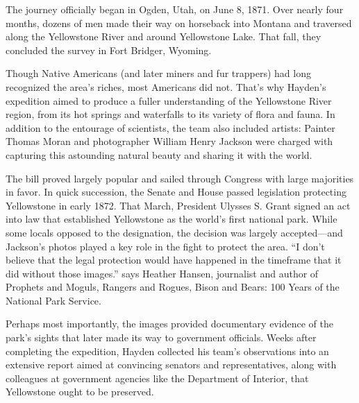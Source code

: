 \begin{listmatch}
\item 
The journey officially began in Ogden, Utah, on June 8, 1871. Over nearly four months, dozens of men made their way on horseback into Montana and traversed along the Yellowstone River and around Yellowstone Lake. That fall, they concluded the survey in Fort Bridger, Wyoming.


\item 
Though Native Americans (and later miners and fur trappers) had long recognized the area's riches, most Americans did not. That's why Hayden's expedition aimed to produce a fuller understanding of the Yellowstone River region, from its hot springs and waterfalls to its variety of flora and fauna. In addition to the entourage of scientists, the team also included artists: Painter Thomas Moran and photographer William Henry Jackson were charged with capturing this astounding natural beauty and sharing it with the world.

\item 
The bill proved largely popular and sailed through Congress with large majorities in favor. In quick succession, the Senate and House passed legislation protecting Yellowstone in early 1872. That March, President Ulysses S. Grant signed an act into law that established Yellowstone as the world's first national park. While some locals opposed to the designation, the decision was largely accepted—and Jackson's photos played a key role in the fight to protect the area. ``I don't believe that the legal protection would have happened in the timeframe that it did without those images.'' says Heather Hansen, journalist and author of Prophets and Moguls, Rangers and Rogues, Bison and Bears: 100 Years of the National Park Service.

\item 
Perhaps most importantly, the images provided documentary evidence of the park's sights that later made its way to government officials. Weeks after completing the expedition, Hayden collected his team's observations into an extensive report aimed at convincing senators and representatives, along with colleagues at government agencies like the Department of Interior, that Yellowstone ought to be preserved.


\end{listmatch}



